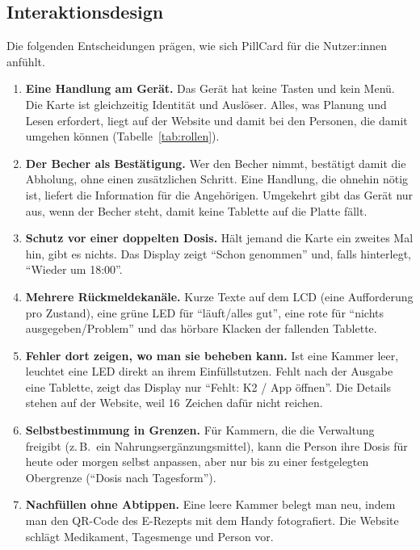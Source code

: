 \documentclass[11pt,a4paper]{article}
\begin{document}
\subsection{Interaktionsdesign}
\label{sec:interaktion}

Die folgenden Entscheidungen prägen, wie sich PillCard für die Nutzer:innen anfühlt.

\begin{enumerate}[label=\textbf{\arabic*.}]
\item \textbf{Eine Handlung am Gerät.} Das Gerät hat keine Tasten und kein Menü. Die Karte ist
  gleichzeitig Identität und Auslöser. Alles, was Planung und Lesen erfordert, liegt auf der Website und
  damit bei den Personen, die damit umgehen können (Tabelle~\ref{tab:rollen}).
\item \textbf{Der Becher als Bestätigung.} Wer den Becher nimmt, bestätigt damit die Abholung, ohne einen
  zusätzlichen Schritt. Eine Handlung, die ohnehin nötig ist, liefert die Information für die Angehörigen.
  Umgekehrt gibt das Gerät nur aus, wenn der Becher steht, damit keine Tablette auf die Platte fällt.
\item \textbf{Schutz vor einer doppelten Dosis.} Hält jemand die Karte ein zweites Mal hin, gibt es nichts.
  Das Display zeigt \enquote{Schon genommen} und, falls hinterlegt, \enquote{Wieder um 18:00}.
\item \textbf{Mehrere Rückmeldekanäle.} Kurze Texte auf dem LCD (eine Aufforderung pro Zustand), eine
  grüne LED für \enquote{läuft/alles gut}, eine rote für \enquote{nichts ausgegeben/Problem} und das
  hörbare Klacken der fallenden Tablette.
\item \textbf{Fehler dort zeigen, wo man sie beheben kann.} Ist eine Kammer leer, leuchtet eine LED direkt
  an ihrem Einfüllstutzen. Fehlt nach der Ausgabe eine Tablette, zeigt das Display nur \enquote{Fehlt: K2 /
  App öffnen}. Die Details stehen auf der Website, weil 16~Zeichen dafür nicht reichen.
\item \textbf{Selbstbestimmung in Grenzen.} Für Kammern, die die Verwaltung freigibt (z.\,B.\ ein
  Nahrungsergänzungsmittel), kann die Person ihre Dosis für heute oder morgen selbst anpassen, aber nur bis
  zu einer festgelegten Obergrenze (\enquote{Dosis nach Tagesform}).
\item \textbf{Nachfüllen ohne Abtippen.} Eine leere Kammer belegt man neu, indem man den QR-Code des
  E-Rezepts mit dem Handy fotografiert. Die Website schlägt Medikament, Tagesmenge und Person vor.
\end{enumerate}
\end{document}
